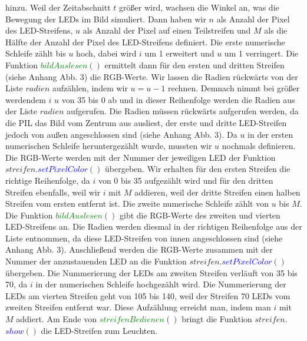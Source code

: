\documentclass [a4paper, 11pt] {article}
\begin{document}
hinzu. Weil der Zeitabschnitt {$t$} größer wird, wachsen die Winkel an, was die Bewegung der LEDs im Bild simuliert. Dann haben wir {$n$} als Anzahl der Pixel des LED-Streifens, {$u$} als Anzahl der Pixel auf einen Teilstreifen und {$M$} als die Hälfte der Anzahl der Pixel des LED-Streifens definiert. Die erste numerische Schleife zählt bis {$u$} hoch, dabei wird {$i$} um 1 erweitert und {$u$}  um 1 verringert. Die Funktion \textcolor{green}{$bildAuslesen$}{$()$} ermittelt dann für den ersten und dritten Streifen (siehe Anhang Abb. 3) die RGB-Werte. Wir lassen die Radien rückwärts von der Liste {$radien$} aufzählen, indem wir {$u = u - 1$} rechnen. Demnach nimmt bei größer werdendem {$i$} {$u$} von 35 bis 0 ab und in dieser Reihenfolge werden die Radien aus der Liste {$radien$} aufgerufen. Die Radien müssen rückwärts aufgerufen werden, da die PIL das Bild vom Zentrum aus ausliest, der erste und dritte LED-Streifen jedoch von außen angeschlossen sind (siehe Anhang Abb. 3). Da {$u$} in der ersten numerischen Schleife heruntergezählt wurde, mussten wir {$u$} nochmals definieren. Die RGB-Werte werden mit der Nummer der jeweiligen LED der Funktion {$streifen.$}\textcolor{blue}{$setPixelColor$}{$()$} übergeben. Wir erhalten für den ersten Streifen die richtige Reihenfolge, da {$i$} von 0 bis 35 aufgezählt wird und für den dritten Streifen ebenfalls, weil wir {$i$} mit {$M$} addieren, weil der dritte Streifen einen halben Streifen vom ersten entfernt ist. Die zweite numerische Schleife zählt von {$u$} bis {$M$}. Die Funktion \textcolor{green}{$bildAuslesen$}{$()$} gibt die RGB-Werte des zweiten und vierten LED-Streifens an. Die Radien werden diesmal in der richtigen Reihenfolge aus der Liste entnommen, da diese LED-Streifen von innen angeschlossen sind (siehe Anhang Abb. 3). Anschließend werden die RGB-Werte zusammen mit der Nummer der anzustauenden LED an die Funktion {$streifen.$}\textcolor{blue}{$setPixelColor$}{$()$} übergeben. Die Nummerierung der LEDs am zweiten Streifen verläuft von 35 bis 70, da {$i$} in der numerischen Schleife hochgezählt wird. Die Nummerierung der LEDs am vierten Streifen geht von 105 bis 140, weil der Streifen 70 LEDs vom zweiten Streifen entfernt war. Diese Aufzählung erreicht man, indem man {$i$} mit {$M$} addiert. Am Ende von \textcolor{green}{$streifenBedienen$}{$()$} bringt die Funktion {$streifen.$}\textcolor{blue}{$show$}{$()$} die LED-Streifen zum Leuchten.
\end{document}
